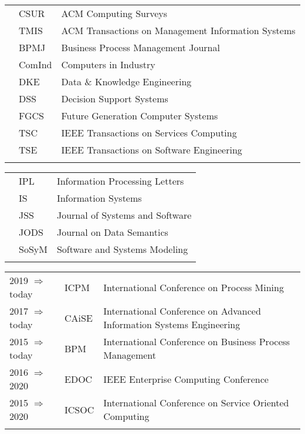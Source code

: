 \raggedright
\begin{tabular}{P{2.5cm}P{2cm}P{11cm}}
	& CSUR		&	ACM Computing Surveys \\\noalign{\smallskip}
	&TMIS		& ACM Transactions on Management Information Systems \\\noalign{\smallskip}
	&BPMJ		& 	Business Process Management Journal\\\noalign{\smallskip}
	&ComInd	& 	Computers in Industry\\\noalign{\smallskip}
	&DKE		& 	Data \& Knowledge Engineering \\\noalign{\smallskip}
	&DSS		& 	Decision Support Systems\\\noalign{\smallskip}
	&FGCS		& Future Generation Computer Systems\\\noalign{\smallskip}
	&TSC		& IEEE Transactions on Services Computing\\\noalign{\smallskip}
	& TSE		& IEEE Transactions on Software Engineering \\\noalign{\smallskip}
		\end{tabular}
	\begin{tabular}{P{2.5cm}P{2cm}P{11cm}}
	&IPL			& Information Processing Letters\\\noalign{\smallskip}
	&IS			& Information Systems\\\noalign{\smallskip}
	&JSS			& Journal of Systems and Software\\\noalign{\smallskip}
	&JODS		& Journal on Data Semantics\\\noalign{\smallskip}
	&SoSyM	& Software and Systems Modeling\\\noalign{\smallskip}
\end{tabular}

\vspace{0.5cm}
\vspace{0.3cm}

\raggedright
\begin{tabular}{P{2.5cm}P{2cm}P{11cm}}
2019 $\Rightarrow$ today		& ICPM 	& International Conference on Process Mining \\\noalign{\smallskip}
2017 $\Rightarrow$ today		& CAiSE	& International Conference on Advanced Information Systems Engineering \\\noalign{\smallskip}
2015 $\Rightarrow$ today		& BPM		& International Conference  on Business Process Management\\\noalign{\smallskip}
2016 $\Rightarrow$  2020		& EDOC	& IEEE Enterprise Computing Conference\\\noalign{\smallskip}
2015 $\Rightarrow$  2020		& ICSOC	& International Conference  on Service Oriented Computing\\\noalign{\smallskip}
\end{tabular}

